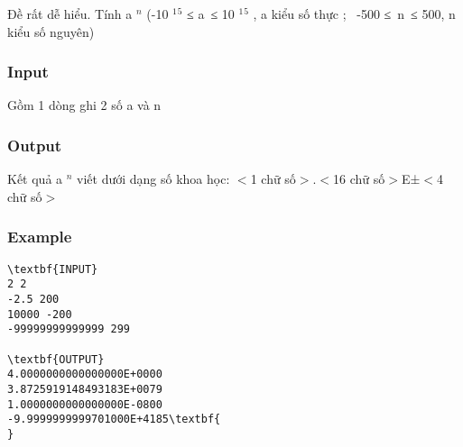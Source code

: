

Đề rất dễ hiểu. Tính a $^ n $ (-10 $^ 1 $$^ 5 $ ≤ a ≤ 10 $^ 1 $$^ 5 $ , a kiểu số thực ;  -500 ≤ n ≤ 500, n kiểu số nguyên)

\subsubsection{Input}

Gồm 1 dòng ghi 2 số a và n

\subsubsection{Output}

Kết quả a $^ n $ viết dưới dạng số khoa học: $<$1 chữ số$>$.$<$16 chữ số$>$E±$<$4 chữ số$>$

\subsubsection{Example}
\begin{verbatim}
\textbf{INPUT}
2 2
-2.5 200
10000 -200
-99999999999999 299

\textbf{OUTPUT}
4.0000000000000000E+0000
3.8725919148493183E+0079
1.0000000000000000E-0800
-9.9999999999701000E+4185\textbf{        
}\end{verbatim}